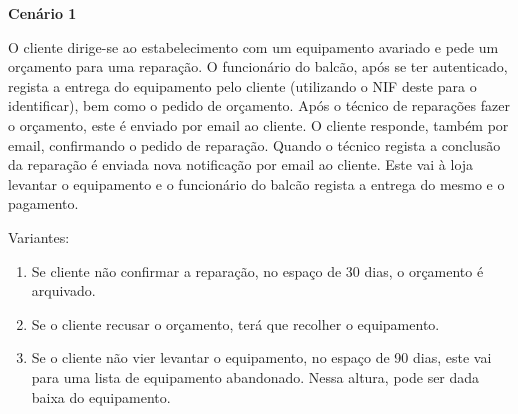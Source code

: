 \documentclass[../relatorio.tex]{subfiles}
\begin{document}
\textbf{Cenário 1} \label{cenario_1}

O cliente dirige-se ao estabelecimento com um equipamento avariado e pede um orçamento para uma reparação. O funcionário do balcão, após
se ter autenticado, regista a entrega do equipamento pelo cliente (utilizando o NIF deste para o identificar), bem como o pedido de orçamento.
Após o técnico de reparações fazer o orçamento, este é enviado por email ao cliente.
O cliente responde, também por email, confirmando o pedido de reparação.
Quando o técnico regista a conclusão da reparação é enviada nova notificação por email ao cliente. Este vai à loja levantar o equipamento e o funcionário
do balcão regista a entrega do mesmo e o pagamento.

Variantes:
\begin{enumerate}
    \item Se cliente não confirmar a reparação, no espaço de 30 dias, o orçamento é arquivado.
    \item Se o cliente recusar o orçamento, terá que recolher o equipamento.
    \item Se o cliente não vier levantar o equipamento, no espaço de 90 dias, este vai para uma lista de equipamento abandonado. Nessa altura, pode ser dada baixa do equipamento.
\end{enumerate}
\end{document}
